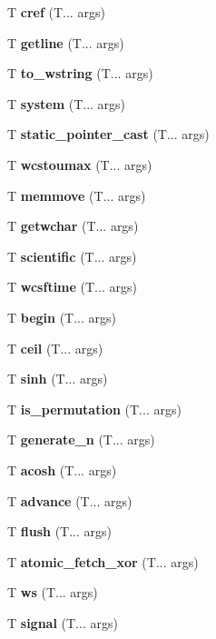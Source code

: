 \begin{DoxyCompactItemize}
T \textbf{ cref} (T... args)
\item 
\mbox{\label{getline}} 
T \textbf{ getline} (T... args)
\item 
\mbox{\label{to_wstring}} 
T \textbf{ to\+\_\+wstring} (T... args)
\item 
\mbox{\label{system}} 
T \textbf{ system} (T... args)
\item 
\mbox{\label{pointer_cast}} 
T \textbf{ static\+\_\+pointer\+\_\+cast} (T... args)
\item 
\mbox{\label{wcstoimax}} 
T \textbf{ wcstoumax} (T... args)
\item 
\mbox{\label{memmove}} 
T \textbf{ memmove} (T... args)
\item 
\mbox{\label{getwchar}} 
T \textbf{ getwchar} (T... args)
\item 
\mbox{\label{fixed}} 
T \textbf{ scientific} (T... args)
\item 
\mbox{\label{wcsftime}} 
T \textbf{ wcsftime} (T... args)
\item 
\mbox{\label{begin}} 
T \textbf{ begin} (T... args)
\item 
\mbox{\label{ceil}} 
T \textbf{ ceil} (T... args)
\item 
\mbox{\label{sinh}} 
T \textbf{ sinh} (T... args)
\item 
\mbox{\label{is_permutation}} 
T \textbf{ is\+\_\+permutation} (T... args)
\item 
\mbox{\label{generate_n}} 
T \textbf{ generate\+\_\+n} (T... args)
\item 
\mbox{\label{acosh}} 
T \textbf{ acosh} (T... args)
\item 
\mbox{\label{advance}} 
T \textbf{ advance} (T... args)
\item 
\mbox{\label{flush}} 
T \textbf{ flush} (T... args)
\item 
\mbox{\label{atomic_fetch_xor}} 
T \textbf{ atomic\+\_\+fetch\+\_\+xor} (T... args)
\item 
\mbox{\label{ws}} 
T \textbf{ ws} (T... args)
\item 
\mbox{\label{signal}} 
T \textbf{ signal} (T... args)
\item 

\end{DoxyCompactItemize}
